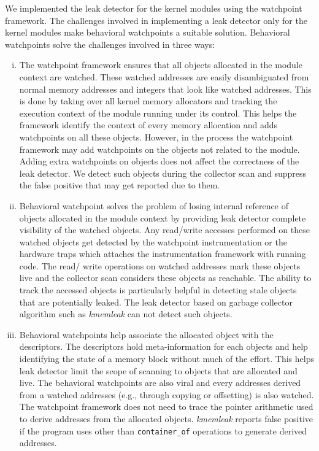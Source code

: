 We implemented the leak detector for the kernel modules using the watchpoint framework. The challenges involved in implementing a leak detector only for the kernel modules make behavioral watchpoints a suitable solution. Behavioral watchpoints solve the challenges involved in three ways:
\begin{enumerate}[i)]
	\item The watchpoint framework ensures that all objects allocated in the module context are watched. These watched addresses are easily disambiguated from normal memory addresses and integers that look like watched addresses. This is done by taking over all kernel memory allocators and tracking the execution context of the module running under its control. This helps the framework identify the context of every memory allocation and adds watchpoints on all these objects. However, in the process the watchpoint framework may add watchpoints on the objects not related to the module. Adding extra watchpoints on objects does not affect the correctness of the leak detector. We detect such objects during the collector scan and suppress the false positive that may get reported due to them.

	\item Behavioral watchpoint solves the problem of losing internal reference of objects allocated in the module context by providing leak detector complete visibility of the watched objects. Any read/write accesses performed on these watched objects get detected by the watchpoint instrumentation or the hardware traps which attaches the instrumentation framework with running code. The read/ write operations on watched addresses mark these objects live and the collector scan considers these objects as reachable. The ability to track the accessed objects is particularly helpful in detecting stale objects that are potentially leaked. The leak detector based on garbage collector algorithm such as \emph{kmemleak} can not detect such objects.

	\item Behavioral watchpoints help associate the allocated object with the descriptors. The descriptors hold meta-information for each objects and help identifying the state of a memory block without much of the effort. This helps leak detector limit the scope of scanning to objects that are allocated and live. The behavioral watchpoints are also viral and every addresses derived from a watched addresses (e.g., through copying or offsetting) is also watched. The watchpoint framework does not need to trace the pointer arithmetic used to derive addresses from the allocated objects. \emph{kmemleak} reports false positive if the program uses other than \texttt{container\_of} operations to generate derived addresses. %
\end{enumerate}


